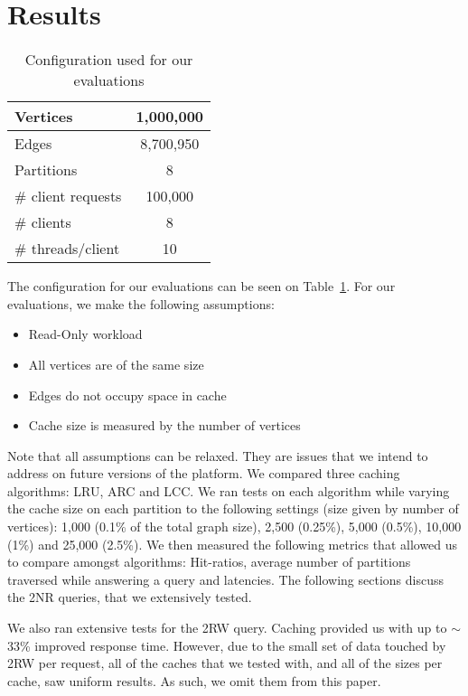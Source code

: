 
\section{Results}

\begin{table}
\centering
\begin{tabular}{ | l | c | }
	\hline
	Vertices & 1,000,000 \\ \hline
	Edges & 8,700,950 \\ \hline
	Partitions & 8 \\ \hline
	\# client requests & 100,000 \\ \hline
	\# clients & 8 \\ \hline
	\# threads/client & 10 \\ \hline
\end{tabular}
\caption{Configuration used for our evaluations}
\label{tbl:graphconfig}
\end{table}

The configuration for our evaluations can be seen on
Table~\ref{tbl:graphconfig}. For our evaluations, we make the following
assumptions:
\begin{itemize}[topsep=0pt]
	\item Read-Only workload
	\item All vertices are of the same size
	\item Edges do not occupy space in cache
	\item Cache size is measured by the number of vertices
\end{itemize}

Note that all assumptions can be relaxed. They are issues that we intend to
address on future versions of the platform. We compared three caching
algorithms: LRU, ARC and LCC. We ran tests on each algorithm while varying the
cache size on each partition to the following settings (size given by number of
vertices): 1,000 (0.1\% of the total graph size), 2,500 (0.25\%), 5,000 (0.5\%),
10,000 (1\%) and 25,000 (2.5\%). We then measured the following metrics that
allowed us to compare amongst algorithms: Hit-ratios, average number of
partitions traversed while answering a query and latencies. The following
sections discuss the 2NR queries, that we extensively tested.

We also ran extensive tests for the 2RW query. Caching provided us with up to
$\sim$ 33\% improved response time. However, due to the small set of data
touched by 2RW per request, all of the caches that we tested with, and all of
the sizes per cache, saw uniform results. As such, we omit them from this paper.

